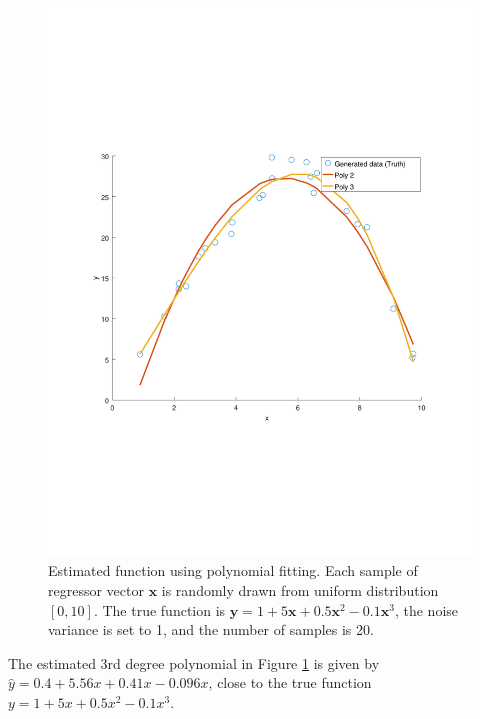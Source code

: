 \documentclass[]{article}
\begin{document}
\begin{figure}[ht]
	\centering
	\includegraphics[trim= 10cm 5cm 10cm 5cm, scale=0.4]{proj1-1d}
	\caption{Estimated function using polynomial fitting. Each sample of regressor vector $\mathbf{x}$ is randomly drawn from uniform distribution $[0,10]$. The true function is $\mathbf{y}=1+5\mathbf{x} + 0.5\mathbf{x}^2 - 0.1\mathbf{x}^3$, the noise variance is set to 1, and the number of samples is 20. }
	\label{fig:poly1d}
\end{figure}

The estimated 3rd degree polynomial in Figure \ref{fig:poly1d} is given by $\hat{y} = 0.4 + 5.56x + 0.41x - 0.096x$, close to the true function $y=1+5x + 0.5x^2 - 0.1x^3$.
\end{document}
